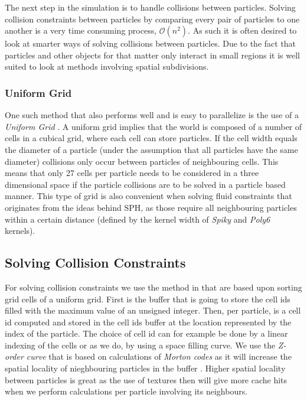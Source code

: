 The next step in the simulation is to handle collisions between particles.
Solving collision constraints between particles by comparing every pair of
particles to one another is a very time consuming process,
$\mathcal{O}(n^{2})$. As such it is often desired to look at smarter ways of
solving collisions between particles. Due to the fact that particles and other
objects for that matter only interact in small regions it is well suited to
look at methods involving spatial subdivisions.

\subsubsection{Uniform Grid}

One such method that also performs well and is easy to parallelize is the use
of a \textit{Uniform Grid} \cite{Green}. A uniform grid implies that the world
is composed of a number of cells in a cubical grid, where each cell can store
particles. If the cell width equals the diameter of a particle (under the
assumption that all particles have the same diameter) collisions only occur
between particles of neighbouring cells. This means that only 27 cells per
particle needs to be considered in a three dimensional space if the particle
collisions are to be solved in a particle based manner. This type of grid is
also convenient when solving fluid constraints that originates from the ideas
behind SPH, as those require all neighbouring particles within a certain
distance (defined by the kernel width of \textit{Spiky} and \textit{Poly6}
kernels).

\subsection{Solving Collision Constraints}

For solving collision constraints we use the method in
\cite{Green} that are based upon sorting grid cells of a uniform grid. First is
the buffer that is going to store the cell ids filled with the maximum value of
an unsigned integer.  Then, per particle, is a cell id computed and stored in
the cell ids buffer at the location represented by the index of the particle.
The choice of cell id can for example be done by a linear indexing of the cells
or as we do, by using a space filling curve. We use the \textit{Z-order curve}
that is based on calculations of \textit{Morton codes} as it will increase the
spatial locality of nieghbouring particles in the buffer \cite{Green}. Higher
spatial locality between particles is great as the use of textures then will
give more cache hits when we perform calculations per particle involving its
neighbours.

